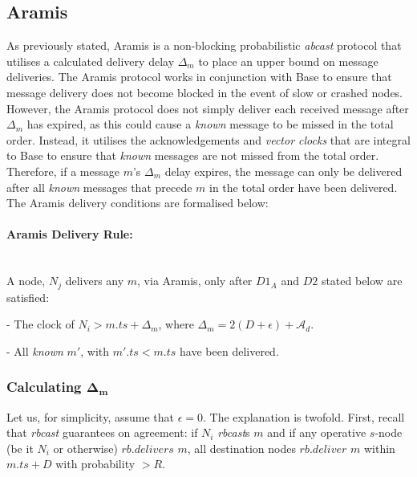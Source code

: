     \subsection{Aramis}\label{ssec:aramis}
    As previously stated,  \textsf{Aramis} is a non-blocking probabilistic \emph{abcast} protocol that utilises a calculated delivery delay $\Delta_m$ to place an upper bound on message deliveries.  The \textsf{Aramis} protocol works in conjunction with \textsf{Base} to ensure that message delivery does not become blocked in the event of slow or crashed nodes.  However, the \textsf{Aramis} protocol does not simply deliver each received message after $\Delta_m$ has expired, as this could cause a \emph{known} message to be missed in the total order.  Instead, it utilises the acknowledgements and \emph{vector clocks} that are integral to \textsf{Base} to ensure that \emph{known} messages are not missed from the total order.  Therefore, if a message $m$'s $\Delta_m$ delay expires, the message can only be delivered after all \emph{known} messages that precede $m$ in the total order have been delivered.  The \textsf{Aramis} delivery conditions are formalised below:
    
    \paragraph{\textsf{Aramis} Delivery Rule:}\hspace{0pt} \\
        A node, $N_j$ delivers any $m$, via \textsf{Aramis}, only after $D1_A$ and $D2$ stated below are satisfied:
        \begin{description}[labelindent=1cm]
            \item[$\boldsymbol{D1_A}$] - The clock of $N_i > m.ts + \Delta_{m}$, where $\Delta_{m} = 2(D + \epsilon) + \mathcal{A}_d$.
            
            \item[$\boldsymbol{D2}$] - All \emph{known} $m'$, with $m'.ts < m.ts$ have been delivered.
        \end{description}
    
    
        \subsubsection*{Calculating $\boldsymbol{\Delta_m}$}
        Let us, for simplicity, assume that $\epsilon = 0$.  The explanation is twofold.  First, recall that \emph{rbcast} guarantees on agreement: if $N_i$ \emph{rbcast}s $m$ and if any operative $s$-node (be it $N_i$ or otherwise) $rb.delivers$ $m$, all destination nodes $rb.deliver$ $m$ within $m.ts + D$ with probability $> R$.  
        
